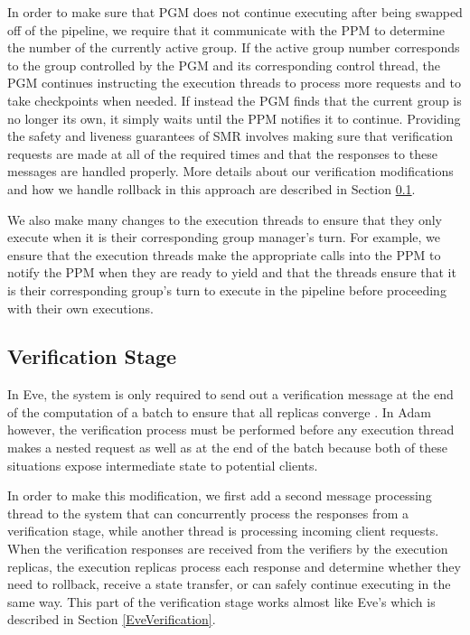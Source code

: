 \documentclass[11pt, oneside]{report}
\begin{document}
In order to make sure that PGM does not continue executing after being swapped off of the pipeline, we require that it communicate with the PPM to determine the number of the currently active group. 
If the active group number corresponds to the group controlled by the PGM and its corresponding control thread, the PGM continues instructing the execution threads to process more requests and to take checkpoints when needed. 
If instead the PGM finds that the current group is no longer its own, it simply waits until the PPM notifies it to continue.
Providing the safety and liveness guarantees of SMR involves making sure that verification requests are made at all of the required times and that the responses to these messages are handled properly. 
More details about our verification modifications and how we handle rollback in this approach are described in Section \ref{Verification}. 

We also make many changes to the execution threads to ensure that they only execute when it is their corresponding group manager's turn.
For example, we ensure that the execution threads make the appropriate calls into the PPM to notify the PPM when they are ready to yield and that the threads ensure that it is their corresponding group's turn to execute in the pipeline before proceeding with their own executions.

\subsection{Verification Stage}\label{Verification}

In Eve, the system is only required to send out a verification message at the end of the computation of a batch to ensure that all replicas converge \cite{eve}.
In Adam however, the verification process must be performed before any execution thread makes a nested request as well as at the end of the batch because both of these situations expose intermediate state to potential clients.


In order to make this modification, we first add a second message processing thread to the system that can concurrently process the responses from a verification stage, while another thread is processing incoming client requests.
When the verification responses are received from the verifiers by the execution replicas, the execution replicas process each response and determine whether they need to rollback, receive a state transfer, or can safely continue executing in the same way. 
This part of the verification stage works almost like Eve's which is described in Section \ref{EveVerification}.
\end{document}
